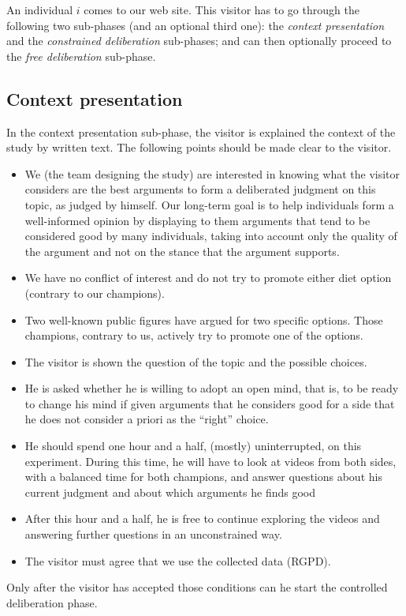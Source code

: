 \documentclass[version=3.21, pagesize, twoside=off, bibliography=totoc, DIV=calc, fontsize=12pt, a4paper]{scrartcl}
\begin{document}
An individual $i$ comes to our web site. This visitor has to go through the following two sub-phases (and an optional third one): the \emph{context presentation} and the \emph{constrained deliberation} sub-phases; and can then optionally proceed to the \emph{free deliberation} sub-phase.

\subsection{Context presentation}
In the context presentation sub-phase, the visitor is explained the context of the study by written text. The following points should be made clear to the visitor.
\begin{itemize}
	\item We (the team designing the study) are interested in knowing what the visitor considers are the best arguments to form a deliberated judgment on this topic, as judged by himself. Our long-term goal is to help individuals form a well-informed opinion by displaying to them arguments that tend to be considered good by many individuals, taking into account only the quality of the argument and not on the stance that the argument supports.
	\item We have no conflict of interest and do not try to promote either diet option (contrary to our champions). 
	\item Two well-known public figures have argued for two specific options. Those champions, contrary to us, actively try to promote one of the options.
	\item The visitor is shown the question of the topic and the possible choices.
	\item He is asked whether he is willing to adopt an open mind, that is, to be ready to change his mind if given arguments that he considers good for a side that he does not consider a priori as the “right” choice. 
	\item He should spend one hour and a half, (mostly) uninterrupted, on this experiment. During this time, he will have to look at videos from both sides, with a balanced time for both champions, and answer questions about his current judgment and about which arguments he finds good  
	\item After this hour and a half, he is free to continue exploring the videos and answering further questions in an unconstrained way.
	\item The visitor must agree that we use the collected data (RGPD).
\end{itemize}
Only after the visitor has accepted those conditions can he start the controlled deliberation phase. 
\end{document}
